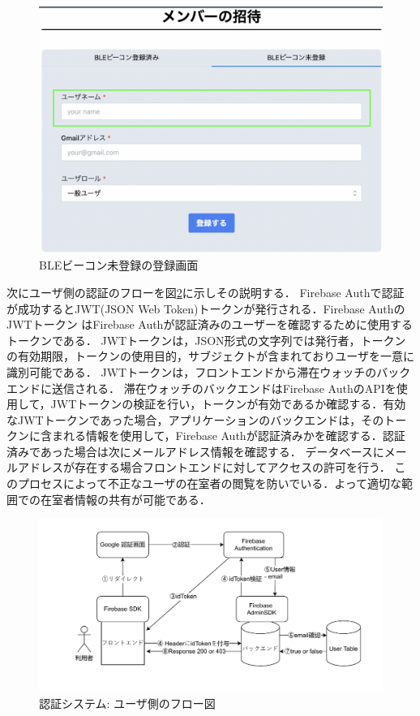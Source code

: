 \begin{figure}[tbh]
  \centering
  \includegraphics[width=16cm]{image/registerNotBLE.png}
  \caption{BLEビーコン未登録の登録画面} \label{fig:registerNotBLE}

\end{figure}


\newpage


次にユーザ側の認証のフローを図\ref{fig:userLogin}に示しその説明する．
Firebase Authで認証が成功するとJWT(JSON Web Token)トークンが発行される．Firebase AuthのJWTトークン はFirebase Authが認証済みのユーザーを確認するために使用するトークンである．
JWTトークンは，JSON形式の文字列では発行者，トークンの有効期限，トークンの使用目的，サブジェクトが含まれておりユーザを一意に識別可能である．
JWTトークンは，フロントエンドから滞在ウォッチのバックエンドに送信される．
滞在ウォッチのバックエンドはFirebase AuthのAPIを使用して，JWTトークンの検証を行い，トークンが有効であるか確認する．有効なJWTトークンであった場合，アプリケーションのバックエンドは，そのトークンに含まれる情報を使用して，Firebase Authが認証済みかを確認する．認証済みであった場合は次にメールアドレス情報を確認する．
データベースにメールアドレスが存在する場合フロントエンドに対してアクセスの許可を行う．
このプロセスによって不正なユーザの在室者の閲覧を防いでいる．よって適切な範囲での在室者情報の共有が可能である．



\newpage

\begin{figure}[h]
  \centering  %
  \includegraphics[clip,scale = 0.8]{image/userLogin.pdf}
  \caption{認証システム: ユーザ側のフロー図}    \label{fig:userLogin}
\end{figure}


